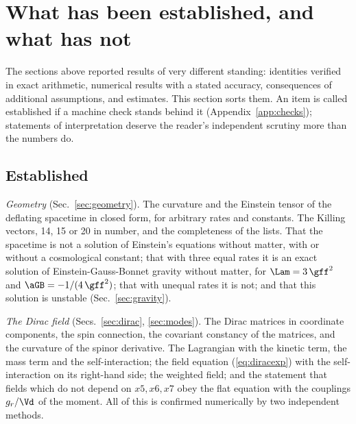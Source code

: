 \section{What has been established, and what has not}
\label{sec:status}

The sections above reported results of very different standing: identities verified in exact
arithmetic, numerical results with a stated accuracy, consequences of additional assumptions, and
estimates. This section sorts them. An item is called established if a machine check stands behind
it (Appendix~\ref{app:checks}); statements of interpretation deserve the reader's independent
scrutiny more than the numbers do.

\subsection{Established}

\emph{Geometry} (Sec.~\ref{sec:geometry}). The curvature and the Einstein tensor of the deflating
spacetime in closed form, for arbitrary rates and constants. The Killing vectors, 14, 15 or 20 in
number, and the completeness of the lists. That the spacetime is not a solution of Einstein's
equations without matter, with or without a cosmological constant; that with three equal rates it is
an exact solution of Einstein-Gauss-Bonnet gravity without matter, for $\Lam=3\,\gff^{2}$ and
$\aGB=-1/(4\,\gff^{2})$; that with unequal rates it is not; and that this solution is unstable
(Sec.~\ref{sec:gravity}).

\emph{The Dirac field} (Secs.~\ref{sec:dirac}, \ref{sec:modes}). The Dirac matrices in coordinate
components, the spin connection, the covariant constancy of the matrices, and the curvature of the
spinor derivative. The Lagrangian with the kinetic term, the mass term and the self-interaction; the
field equation (\ref{eq:diracexp}) with the self-interaction on its right-hand side; the weighted
field; and the statement that fields which do not depend on $x5,x6,x7$ obey the flat equation with
the couplings $g_r/\Vd$ of the moment.
 All of this is confirmed
numerically by two independent methods.

